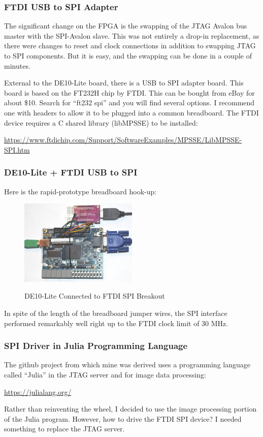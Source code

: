 \documentclass{beamer}
\begin{document}
\begin{frame}
\frametitle{FTDI USB to SPI Adapter}

The significant change on the FPGA is the swapping of the JTAG Avalon bus master with the SPI-Avalon slave.  This was not entirely a drop-in replacement, as there were changes to reset and clock connections in addition to swapping JTAG to SPI components.  But it is easy, and the swapping can be done in a couple of minutes.

External to the DE10-Lite board, there is a USB to SPI adapter board.  This board is based on the FT232H chip by FTDI.  This can be bought from eBay for about \$10.  Search for ``ft232 spi'' and you will find several options.  I recommend one with headers to allow it to be plugged into a common breadboard.  The FTDI device requires a C shared library (libMPSSE) to be installed:

\url{https://www.ftdichip.com/Support/SoftwareExamples/MPSSE/LibMPSSE-SPI.htm}

\end{frame}

\begin{frame}
\frametitle{DE10-Lite + FTDI USB to SPI}

Here is the rapid-prototype breadboard hook-up:

\begin{figure}[h]
	\centering
	\includegraphics[width=0.5\textwidth]{graphics/de10_spi}
	\centering\bfseries
	\caption{DE10-Lite Connected to FTDI SPI Breakout}
\end{figure}

In spite of the length of the breadboard jumper wires, the SPI interface performed remarkably well right up to the FTDI clock limit of 30 MHz.

\end{frame}

\begin{frame}
\frametitle{SPI Driver in Julia Programming Language}

The github project from which mine was derived uses a programming language called ``Julia'' in the JTAG server and for image data processing:

\url{https://julialang.org/}

Rather than reinventing the wheel, I decided to use the image processing portion of the Julia program.
However, how to drive the FTDI SPI device?  I needed something to replace the JTAG server.

\end{frame}
\end{document}

